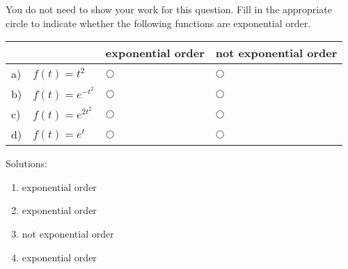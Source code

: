 \ifnum {}
\question[1] You do not need to show your work for this question. Fill in the appropriate circle to indicate whether the following functions are exponential order. 
\vspace{-0.2cm}
\setlength{\extrarowheight}{0.20cm}
\begin{center}
\hspace{-.9cm}\begin{tabular}{ p{0.20cm} p{4cm} p{3.5cm} p{4cm} }
    & & exponential order &  not exponential order  \\[2pt] \hline 
    a) & $f(t) = t^2$ & $\bigcirc$  & $\bigcirc$ \\[8pt]  
    b) & $f(t) = e^{-t^2}$  & $\bigcirc$  & $\bigcirc$ \\[8pt] 
    c) & $f(t) = e^{2t^2}$  & $\bigcirc$  & $\bigcirc$ \\[8pt] 
    d) & $f(t) = e^{t}$  & $\bigcirc$  & $\bigcirc$ \\[8pt] 
    \hline
\end{tabular}
\end{center}
\setlength{\extrarowheight}{0.0cm}
\ifnum {} {\color{DarkBlue} Solutions: 
\begin{enumerate}[label=(\alph*)]
    \item exponential order
    \item exponential order
    \item not exponential order
    \item exponential order
\end{enumerate}
}
\fi
\vspace{-6pt} 
\fi 


